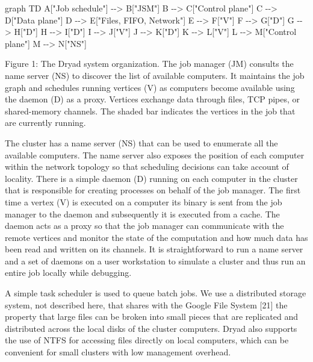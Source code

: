 \documentclass[
]{article}
\newenvironment{Shaded}{}{}
\newcommand{\NormalTok}[1]{#1}
\begin{document}
\begin{Shaded}
\begin{Highlighting}[]
\NormalTok{graph TD}
\NormalTok{    A["Job schedule"] {-}{-}\textgreater{} B["JSM"]}
\NormalTok{    B {-}{-}\textgreater{} C["Control plane"]}
\NormalTok{    C {-}{-}\textgreater{} D["Data plane"]}
\NormalTok{    D {-}{-}\textgreater{} E["Files, FIFO, Network"]}
\NormalTok{    E {-}{-}\textgreater{} F["V"]}
\NormalTok{    F {-}{-}\textgreater{} G["D"]}
\NormalTok{    G {-}{-}\textgreater{} H["D"]}
\NormalTok{    H {-}{-}\textgreater{} I["D"]}
\NormalTok{    I {-}{-}\textgreater{} J["V"]}
\NormalTok{    J {-}{-}\textgreater{} K["D"]}
\NormalTok{    K {-}{-}\textgreater{} L["V"]}
\NormalTok{    L {-}{-}\textgreater{} M["Control plane"]}
\NormalTok{    M {-}{-}\textgreater{} N["NS"]}
\end{Highlighting}
\end{Shaded}

Figure 1: The Dryad system organization. The job manager (JM) consults
the name server (NS) to discover the list of available computers. It
maintains the job graph and schedules running vertices (V) as computers
become available using the daemon (D) as a proxy. Vertices exchange data
through files, TCP pipes, or shared-memory channels. The shaded bar
indicates the vertices in the job that are currently running.

The cluster has a name server (NS) that can be used to enumerate all the
available computers. The name server also exposes the position of each
computer within the network topology so that scheduling decisions can
take account of locality. There is a simple daemon (D) running on each
computer in the cluster that is responsible for creating processes on
behalf of the job manager. The first time a vertex (V) is executed on a
computer its binary is sent from the job manager to the daemon and
subsequently it is executed from a cache. The daemon acts as a proxy so
that the job manager can communicate with the remote vertices and
monitor the state of the computation and how much data has been read and
written on its channels. It is straightforward to run a name server and
a set of daemons on a user workstation to simulate a cluster and thus
run an entire job locally while debugging.

A simple task scheduler is used to queue batch jobs. We use a
distributed storage system, not described here, that shares with the
Google File System {[}21{]} the property that large files can be broken
into small pieces that are replicated and distributed across the local
disks of the cluster computers. Dryad also supports the use of NTFS for
accessing files directly on local computers, which can be convenient for
small clusters with low management overhead.
\end{document}
